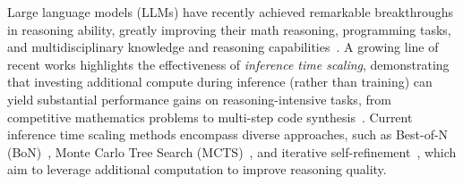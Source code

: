\documentclass{article} %
\theoremstyle{definition}
\theoremstyle{remark}
\begin{document}
Large language models (LLMs) have recently achieved remarkable breakthroughs in reasoning ability, greatly improving their math reasoning,
programming tasks, and multidisciplinary knowledge and reasoning capabilities~\citep{chenprogram, chen2025towards, chen2024m3cot,zhou2023leasttomost, yue2024mmmu, wei2022chain}. A growing line of recent works highlights the effectiveness of \textit{inference time scaling}, demonstrating that investing additional compute during inference (rather than training) can yield substantial performance gains on reasoning-intensive tasks, from competitive mathematics problems to multi-step code synthesis~\citep{light2025sfs, light2025strategist, li2025a, wu2025inference, zhang2025aflow}. Current inference time scaling methods encompass diverse approaches, such as Best-of-N (BoN)~\citep{li-etal-2023-making}, Monte Carlo Tree Search (MCTS)~\citep{yao2023tree}, and iterative self-refinement~\citep{yao2023react}, which aim to leverage additional computation to improve reasoning quality.
\end{document}
